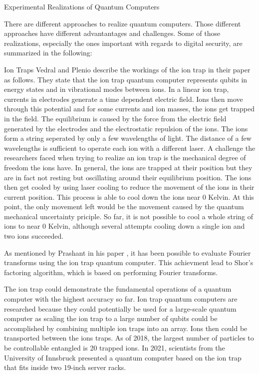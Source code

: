 \documentclass[aps,preprintnumbers,twocolumn]{revtex4}
\begin{document}
\begin{section}{Experimental Realizations of Quantum Computers}

There are different approaches to realize quantum computers.
Those different approaches have different advantantages and challenges. 
Some of those realizations, especially the ones important with regards to digital security, 
are summarized in the following:

\begin{subsection}{Ion Traps}
Vedral and Plenio describe the workings of the ion trap in their paper \cite[p.12-13]{2008} as follows. 
They state that the ion trap quantum computer represents qubits in energy states and in vibrational modes between ions. 
In a linear ion trap, currents in electrodes generate a time dependent electric field. 
Ions then move through this potential and for some currents and ion masses, the ions get trapped in the field. 
The equilibrium is caused by the force from the electric field generated by the electrodes and the electrostatic repulsion of the ions. 
The ions form a string seperated by only a few wavelengths of light. 
The distance of a few wavelengths is sufficient to operate each ion with a different laser. 
A challenge the researchers faced when trying to realize an ion trap is the mechanical degree of freedom the ions have. 
In general, the ions are trapped at their position but they are in fact not resting but oscillating around their equilibrium position. 
The ions then get cooled by using laser cooling to reduce the movement of the ions in their current position. 
This process is able to cool down the ions near 0 Kelvin. 
At this point, the only movement left would be the movement caused by the quantum mechanical uncertainty priciple. 
So far, it is not possible to cool a whole string of ions to near 0 Kelvin, 
although several attempts cooling down a single ion and two ions succeeded. 

As mentioned by Prashant in his paper \cite[p.20]{prashant}, it has been possible to evaluate Fourier transforms using the ion trap quantum computer.
This achievment lead to Shor's factoring algorithm, 
which is based on performing Fourier transforms.

The ion trap could demonstrate the fundamental operations of a quantum computer with the highest accuracy so far. 
Ion trap quantum computers are researched because they could potentially be used for a large-scale quantum computer as scaling the ion trap to a large number of qubits could be accomplished by combining multiple ion traps into an array. Ions then could be transported between the ions traps. 
As of 2018, the largest number of particles to be controllable entangled is 20 trapped ions. 
In 2021, scientists from the University of Innsbruck presented a quantum computer based on the ion trap that fits inside two 19-inch server racks.
\end{subsection}


\end{section}
\end{document}
